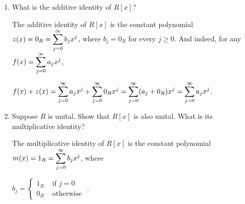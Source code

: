 \documentclass[11pt,fleqn,dvipsnames,usenames]{article}
\begin{document}
\begin{enumerate}[1.]
\begin{multicols}{3}
\begin{itemize}
\item $x^2$
\item $x^2 + 1$
\item $x^2 + 2$
\item $x^2 + x$
\item $x^2 + x + 1$
\item $x^2 + x + 2$
\item $x^2 + 2x$
\item $x^2 + 2x + 1$
\item $x^2 + 2x + 2$
\columnbreak

\item $2x^2$
\item $2x^2 + 1$
\item $2x^2 + 2$
\item $2x^2 + x$
\item $2x^2 + x + 1$
\item $2x^2 + x + 2$
\item $2x^2 + 2x$
\item $2x^2 + 2x + 1$
\item $2x^2 + 2x + 2$
\end{itemize}
\end{multicols}

\item What is the additive identity of $R[x]$?
\vsmsp

\solution The additive identity of $R[x]$ is the constant polynomial $z(x) = 0_{R} = \displaystyle\sum\limits_{j=0}^{\infty}b_{j}x^{j}$, where $b_{j} = 0_{R}$ for every $j\geq 0$.  And indeed, for any $f(x) = \displaystyle\sum\limits_{j=0}^{\infty}a_{j}x^{j}$,
\begin{center}
$f(x) + z(x) = \displaystyle\sum\limits_{j=0}^{\infty}a_{j}x^{j} + \displaystyle\sum\limits_{j=0}^{\infty}0_{R}x^{j} = \displaystyle\sum\limits_{j=0}^{\infty}(a_{j}+0_{R})x^{j} = \displaystyle\sum\limits_{j=0}^{\infty}a_{j}x^{j}$.
\end{center}

\item Suppose $R$ is unital.  Show that $R[x]$ is also unital.  What is its multiplicative identity?
\vsmsp

\solution The multiplicative identity of $R[x]$ is the constant polynomial $m(x) = 1_{R} = \displaystyle\sum\limits_{j=0}^{\infty}b_{j}x^{j}$, where
\begin{center}
$b_{j} = \begin{cases}1_{R}& \text{ if }j=0\\0_{R}& \text{ otherwise }\end{cases}$.
\end{center}


\end{enumerate}
\end{document}
